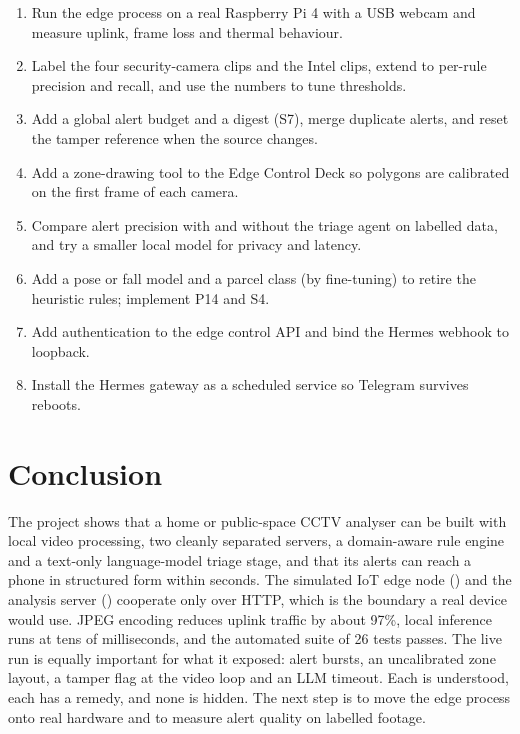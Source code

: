\documentclass[11pt]{article}
\DeclareRobustCommand{\code}[1]{\texttt{\detokenize{#1}}}
\begin{document}
\begin{enumerate}
  \item Run the edge process on a real Raspberry Pi 4 with a USB webcam and measure uplink, frame loss and thermal behaviour.
  \item Label the four security-camera clips and the Intel clips, extend \code{eval.py} to per-rule precision and recall, and use the numbers to tune thresholds.
  \item Add a global alert budget and a digest (S7), merge duplicate alerts, and reset the tamper reference when the source changes.
  \item Add a zone-drawing tool to the Edge Control Deck so polygons are calibrated on the first frame of each camera.
  \item Compare alert precision with and without the triage agent on labelled data, and try a smaller local model for privacy and latency.
  \item Add a pose or fall model and a parcel class (by fine-tuning) to retire the heuristic rules; implement P14 and S4.
  \item Add authentication to the edge control API and bind the Hermes webhook to loopback.
  \item Install the Hermes gateway as a scheduled service so Telegram survives reboots.
\end{enumerate}

\section{Conclusion}

The project shows that a home or public-space CCTV analyser can be built with local video processing, two cleanly separated servers, a domain-aware rule engine and a text-only language-model triage stage, and that its alerts can reach a phone in structured form within seconds. The simulated IoT edge node (\code{:8001}) and the analysis server (\code{:8000}) cooperate only over HTTP, which is the boundary a real device would use. JPEG encoding reduces uplink traffic by about 97\%, local inference runs at tens of milliseconds, and the automated suite of 26 tests passes. The live run is equally important for what it exposed: alert bursts, an uncalibrated zone layout, a tamper flag at the video loop and an LLM timeout. Each is understood, each has a remedy, and none is hidden. The next step is to move the edge process onto real hardware and to measure alert quality on labelled footage.
\end{document}
